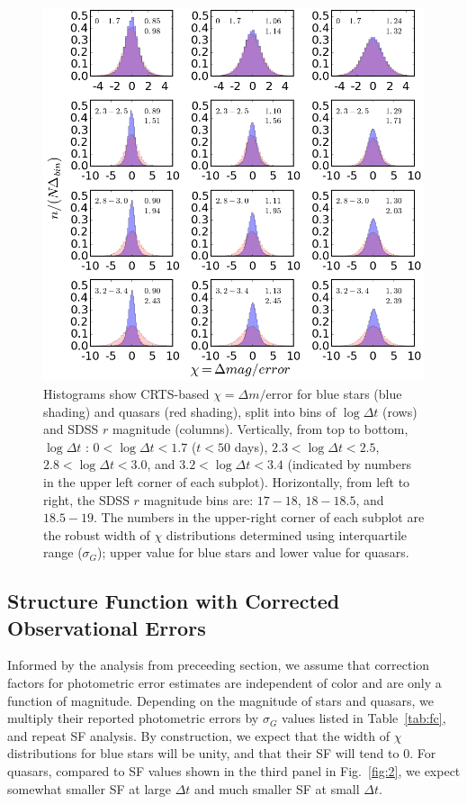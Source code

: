 \documentclass[fleqn,usenatbib]{mnras}  %
\begin{document}
\begin{figure}
\includegraphics[width=1.1\columnwidth, center]{Fig_3_histogram_panels.png}
\vskip -0.15in
\caption{Histograms show CRTS-based $\chi = \Delta m / \mathrm{error}$ for blue stars (blue shading) 
and quasars (red shading), split into bins of $\log{\Delta t}$ (rows) and SDSS $r$ magnitude (columns). 
Vertically, from top to bottom, $\log{\Delta t}$ : $0<\log{\Delta t}<1.7$ ($t < 50 $ days), 
$2.3<\log{\Delta t}<2.5$, $2.8<\log{\Delta t}<3.0$, and $3.2<\log{\Delta t}<3.4$ (indicated by numbers
 in the upper left corner of each subplot). Horizontally, from left to right, the SDSS $r$ magnitude bins are: 
$17-18$,  $18-18.5$, and $18.5-19$. The numbers in the upper-right corner of each subplot are the 
robust width of $\chi$ distributions determined using interquartile range ($\sigma_G$); upper value for
blue stars and lower value for quasars.}
\label{fig:3}
\end{figure}



\subsection{Structure Function with Corrected Observational Errors}

Informed by the analysis from preceeding section, we assume that correction factors for photometric
error estimates are independent of color and are only a function of magnitude. Depending on the magnitude
of stars and quasars, we multiply their reported photometric errors by $\sigma_G$ values listed in 
Table~\ref{tab:fc}, and repeat SF analysis. By construction, we expect that the width of $\chi$ distributions
for blue stars will be unity, and that their SF will tend to 0. For quasars, compared to SF values shown in the third 
panel in Fig.~\ref{fig:2}, we expect somewhat smaller SF at large $\Delta t$ and much smaller SF at small $\Delta t$. 
\end{document}
